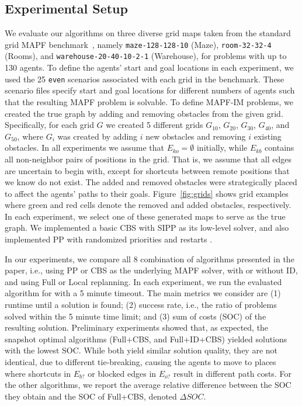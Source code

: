 \documentclass[letterpaper]{article} %
\def\
UrlFont{\rm}  %
\newcommand{\eko}{E_{ko}} %
\newcommand{\ekb}{E_{kb}} %
\newcommand{\eao}{E_{o?}} %
\newcommand{\eab}{E_{b?}} %
\theoremstyle{definition}
\begin{document}
\subsection{Experimental Setup}
We evaluate our algorithms on three diverse grid maps taken from the standard grid MAPF benchmark~\cite{stern2019multi}, namely \texttt{maze-128-128-10} (Maze), 
\texttt{room-32-32-4} (Rooms), and 
\texttt{warehouse-20-40-10-2-1} (Warehouse), 
for problems with up to 130 agents. 
To define the agents' start and goal locations in each experiment, we used the 25 \texttt{even} scenarios associated with each grid in the benchmark. These scenario files specify start and goal locations for different numbers of agents such that the resulting MAPF problem is solvable. 
To define MAPF-IM problems, we created the true graph by adding and removing obstacles from the given grid. 
Specifically, for each grid $G$ we created 5 different grids $G_{10}$, 
$G_{20}$, $G_{30}$, $G_{40}$, and $G_{50}$, where $G_i$ was created by adding $i$ new obstacles and removing $i$ existing obstacles. In all experiments we assume that $\eko=\emptyset$ initially, while $\ekb$ contains all non-neighbor pairs of positions in the grid. That is, we assume that all edges are uncertain to begin with, except for shortcuts between remote positions that we know do not exist.
The added and removed obstacles were strategically placed to affect the agents' paths to their goals. Figure~\ref{fig:grids} shows grid examples where green and red cells denote the removed and added obstacles, respectively. 
In each experiment, we select one of these generated maps to serve as the true graph. We implemented a basic CBS  \cite{sharon2015conflict} with SIPP \cite{phillips2011sipp} as its low-level solver, and also implemented PP with randomized priorities and restarts \cite{bennewitz2001optimizing}.

In our experiments, we compare all 8 combination of algorithms presented in the paper, i.e., using PP or CBS as the underlying MAPF solver, 
with or without ID, and using Full or Local replanning. 
In each experiment, we run the evaluated algorithm for with a 5 minute timeout. 
The main metrics we consider are (1) runtime until a solution is found; 
(2) success rate, i.e., the ratio of problems solved within the 5 minute time limit; and (3) sum of costs (SOC) of the resulting solution. 
Preliminary experiments showed that, as expected, the snapshot optimal algorithms (Full+CBS, and Full+ID+CBS) yielded solutions with the lowest SOC. While both yield similar solution quality, they are not identical, due to different tie-breaking, causing the agents to move to places where shortcuts in $\eab$ or blocked edges in $\eao$ result in different path costs.
For the other algorithms, we report the average relative difference between the SOC they obtain and the SOC of Full+CBS, denoted $\Delta SOC$.
\end{document}

